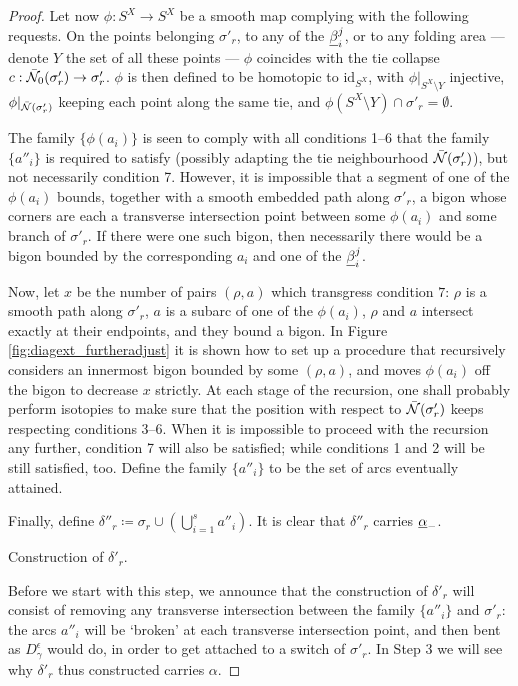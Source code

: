 \begin{proof}
Let now $\phi:S^X\rightarrow S^X$ be a smooth map complying with the following requests. On the points belonging $\sigma'_r$, to any of the $\underline{\beta}_i^j$, or to any folding area --- denote $Y$ the set of all these points --- $\phi$ coincides with the tie collapse $c:\bar{{\mathcal N}}_0(\sigma'_r)\rightarrow \sigma'_r$. $\phi$ is then defined to be homotopic to $\mathrm{id}_{S^X}$, with $\phi|_{S^X\setminus Y}$ injective, $\phi|_{\bar{{\mathcal N}}(\sigma'_r)}$ keeping each point along the same tie, and $\phi(S^X\setminus Y)\cap \sigma'_r=\emptyset$.

The family $\{\phi(a_i)\}$ is seen to comply with all conditions 1--6 that the family $\{a''_i\}$ is required to satisfy (possibly adapting the tie neighbourhood $\bar{{\mathcal N}}(\sigma'_r)$), but not necessarily condition 7. However, it is impossible that a segment of one of the $\phi(a_i)$ bounds, together with a smooth embedded path along $\sigma'_r$, a bigon whose corners are each a transverse intersection point between some $\phi(a_i)$ and some branch of $\sigma'_r$. If there were one such bigon, then necessarily there would be a bigon bounded by the corresponding $a_i$ and one of the $\underline{\beta}_i^j$.

Now, let $x$ be the number of pairs $(\rho,a)$ which transgress condition $7$: $\rho$ is a smooth path along $\sigma'_r$, $a$ is a subarc of one of the $\phi(a_i)$, $\rho$ and $a$ intersect exactly at their endpoints, and they bound a bigon. In Figure \ref{fig:diagext_furtheradjust} it is shown how to set up a procedure that recursively considers an innermost bigon bounded by some $(\rho,a)$, and moves $\phi(a_i)$ off the bigon to decrease $x$ strictly. At each stage of the recursion, one shall probably perform isotopies to make sure that the position with respect to $\bar{{\mathcal N}}(\sigma'_r)$ keeps respecting conditions 3--6. When it is impossible to proceed with the recursion any further, condition 7 will also be satisfied; while conditions 1 and 2 will be still satisfied, too. Define the family $\{a''_i\}$ to be the set of arcs eventually attained.

Finally, define $\delta''_r\coloneqq \sigma_r\cup\left(\bigcup_{i=1}^s a''_i\right)$. It is clear that $\delta''_r$ carries $\underline{\alpha}_-$.

 Construction of $\delta'_r$.

Before we start with this step, we announce that the construction of $\delta'_r$ will consist of removing any transverse intersection between the family $\{a''_i\}$ and $\sigma'_r$: the arcs $a''_i$ will be `broken' at each transverse intersection point, and then bent as $D_\gamma^\epsilon$ would do, in order to get attached to a switch of $\sigma'_r$. In Step 3 we will see why $\delta'_r$ thus constructed carries $\alpha$.


\end{proof}
